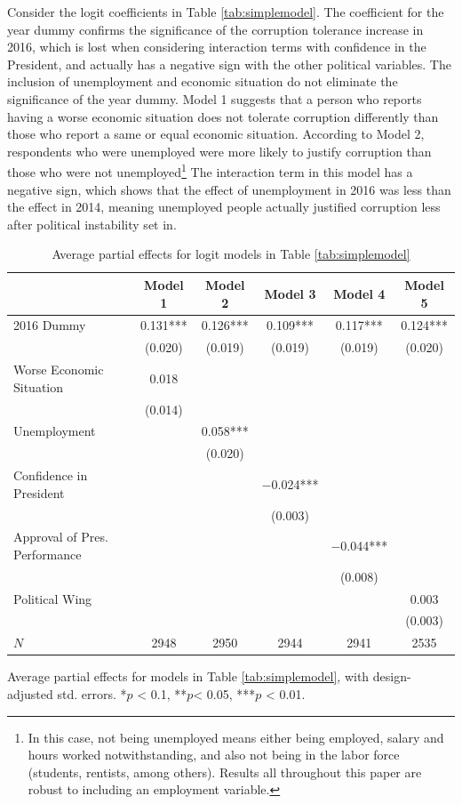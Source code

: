 \documentclass[12pt,a4]{article}\usepackage[]{graphicx}\usepackage[]{xcolor}
\begin{document}
Consider the logit coefficients in Table \ref{tab:simplemodel}. The coefficient for the year dummy confirms the significance of the corruption tolerance increase in 2016, which is lost when considering interaction terms with confidence in the President, and actually has a negative sign with the other political variables. The inclusion of unemployment and economic situation do not eliminate the significance of the year dummy. Model 1 suggests that a person who reports having a worse economic situation does not tolerate corruption differently than those who report a same or equal economic situation. According to Model 2, respondents who were unemployed were more likely to justify corruption than those who were not unemployed\footnote{In this case, not being unemployed means either being employed, salary and hours worked notwithstanding, and also not being in the labor force (students, rentists, among others). Results all throughout this paper are robust to including an employment variable.} The interaction term in this model has a negative sign, which shows that the effect of unemployment in 2016 was less than the effect in 2014, meaning unemployed people actually justified corruption less after political instability set in. 

\begin{table}[htbp!]
\caption{Average partial effects for logit models in Table \ref{tab:simplemodel}}
\label{tab:apesimp}

\begin{tabular}[t]{lccccc}
\toprule
  & Model 1 & Model 2 & Model 3 & Model 4 & Model 5\\
\midrule
2016 Dummy & \num{0.131}*** & \num{0.126}*** & \num{0.109}*** & \num{0.117}*** & \num{0.124}***\\
 & (\num{0.020}) & (\num{0.019}) & (\num{0.019}) & (\num{0.019}) & (\num{0.020})\\
Worse Economic Situation & \num{0.018} &  &  &  & \\
 & (\num{0.014}) &  &  &  & \\
Unemployment &  & \num{0.058}*** &  &  & \\
 &  & (\num{0.020}) &  &  & \\
Confidence in President &  &  & \num{-0.024}*** &  & \\
 &  &  & (\num{0.003}) &  & \\
Approval of Pres. Performance &  &  &  & \num{-0.044}*** & \\
 &  &  &  & (\num{0.008}) & \\
Political Wing &  &  &  &  & \num{0.003}\\
 &  &  &  &  & (\num{0.003})\\
\midrule
$N$ & \num{2948} & \num{2950} & \num{2944} & \num{2941} & \num{2535}\\
\bottomrule
\end{tabular}


\vspace{0.15cm}
Average partial effects for models in Table \ref{tab:simplemodel}, with design-adjusted std. errors. *$p$ < 0.1, **$p$< 0.05, ***$p$ < 0.01.
\end{table}
\end{document}
